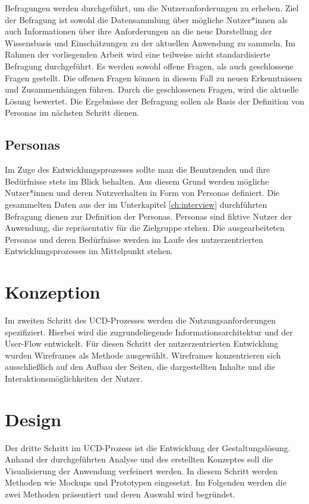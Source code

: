 Befragungen werden durchgeführt, um die Nutzeranforderungen zu erheben.
Ziel der Befragung ist sowohl die Datensammlung über mögliche Nutzer*innen als auch Informationen über ihre Anforderungen an die neue Darstellung der Wissensbasis und Einschätzungen zu der aktuellen Anwendung zu sammeln. 
Im Rahmen der vorliegenden Arbeit wird eine teilweise nicht standardisierte Befragung durchgeführt.
Es werden sowohl offene Fragen, als auch geschlossene Fragen gestellt.
Die offenen Fragen können in diesem Fall zu neuen Erkenntnissen und Zusammenhängen führen.
Durch die geschlossenen Fragen, wird die aktuelle Lösung bewertet.
Die Ergebnisse der Befragung sollen als Basis der Definition von Personas im nächsten Schritt dienen.

\subsection{Personas}

Im Zuge des Entwicklungsprozesses sollte man die Benutzenden und ihre Bedürfnisse stets im Blick behalten.
Aus diesem Grund werden mögliche Nutzer*innen und deren Nutzverhalten in Form von Personas definiert.
Die gesammelten Daten aus der im Unterkapitel \ref{ch:interview} durchführten Befragung dienen zur Definition der Personas.
Personas sind fiktive Nutzer der Anwendung, die repräsentativ für die Zielgruppe stehen.
Die ausgearbeiteten Personas und deren Bedürfnisse werden im Laufe des nutzerzentrierten Entwicklungsprozesses im Mittelpunkt stehen.

\section{Konzeption}\label{sec:concept}

Im zweiten Schritt des \ac{UCD}-Prozesses werden die Nutzungsanforderungen spezifiziert.
Hierbei wird die zugrundeliegende Informationsarchitektur und der User-Flow entwickelt.
Für diesen Schritt der nutzerzentrierten Entwicklung wurden Wireframes als Methode ausgewählt.
Wireframes konzentrieren sich ausschließlich auf den Aufbau der Seiten, die dargestellten Inhalte und die Interaktionsmöglichkeiten der Nutzer.

\section{Design}

Der dritte Schritt im \ac{UCD}-Prozess ist die Entwicklung der Gestaltungslösung.
Anhand der durchgeführten Analyse und des erstellten Konzeptes soll die Visualisierung der Anwendung verfeinert werden.
In diesem Schritt werden Methoden wie Mockups und Prototypen eingesetzt.
Im Folgenden werden die zwei Methoden präsentiert und deren Auswahl wird begründet.

